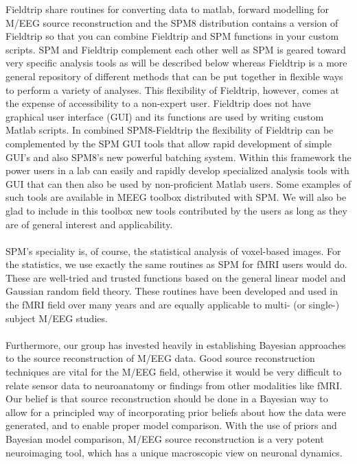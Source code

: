 Fieldtrip share routines for converting data to matlab, forward modelling 
for M/EEG source reconstruction and the SPM8 distribution contains
a version of Fieldtrip so that you can combine Fieldtrip and SPM 
functions in your custom scripts. SPM and Fieldtrip complement each
other well as SPM is geared toward very specific analysis tools as 
will be described below whereas Fieldtrip is a more general repository 
of different methods that can be put together in flexible ways
to perform a variety of analyses. This flexibility of Fieldtrip, however, 
comes at the expense of accessibility to a non-expert user. Fieldtrip does
not have graphical user interface (GUI) and its functions are used by 
writing custom Matlab scripts. In combined SPM8-Fieldtrip the
flexibility of Fieldtrip can be complemented by the SPM GUI 
tools that allow rapid development of simple GUI's and also SPM8's new
powerful batching system. Within this framework the power users in a lab
can easily and rapidly develop specialized analysis tools with GUI that 
can then  also be used by non-proficient Matlab users. Some examples of such
tools are available in MEEG toolbox distributed with SPM. We will also be
glad to include in this toolbox new tools contributed by the users as long
as they are of general interest and applicability. 
\\
\\
SPM's speciality is, of course, the statistical analysis of voxel-based
images. For the statistics, we use exactly the same routines as SPM
for fMRI users would do. These are well-tried and trusted functions
based on the general linear model and Gaussian random field theory.
These routines have been developed and used in the fMRI field over
many years and are equally applicable to multi- (or single-) subject
M/EEG studies.
\\
\\
Furthermore, our group has invested heavily in establishing Bayesian
approaches to the source reconstruction of M/EEG data. Good source
reconstruction techniques are vital for the M/EEG field, otherwise it
would be very difficult to relate sensor data to neuroanatomy or
findings from other modalities like fMRI. Our belief is that source
reconstruction should be done in a Bayesian way to allow for a
principled way of incorporating prior beliefs about how the data were
generated, and to enable proper model comparison. With the use of
priors and Bayesian model comparison, M/EEG source reconstruction is a
very potent neuroimaging tool, which has a unique macroscopic view on
neuronal dynamics.

